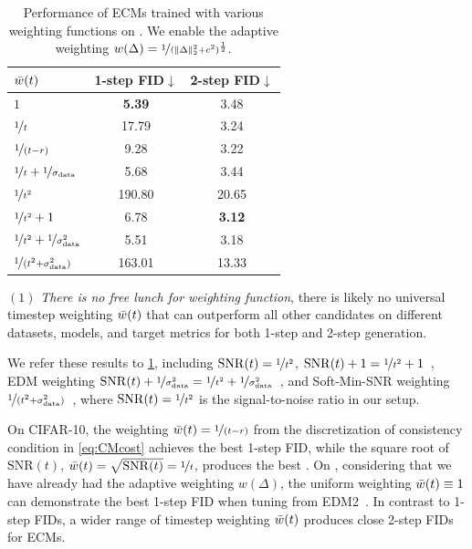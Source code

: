 \begin{table}[t!]
\vspace{5pt}
\caption{Performance of ECMs trained with various weighting functions on \imgnet. We enable the adaptive weighting $w(\Delta) = \nicefrac{1}{(\|\Delta\|_2^2 + c^2)^{\frac{1}{2}}}$.}
\vspace{5pt}
\centering
\begin{tabular}{@{}lcc@{}} 
\toprule
$\Bar{w}(t)$ & 1-step FID$\downarrow$ & 2-step FID$\downarrow$ \\ 
\midrule
$1$                   & \textbf{5.39}   & 3.48  \\
$\nicefrac{1}{t}$     & 17.79	        & 3.24  \\
$\nicefrac{1}{(t-r)}$ & 9.28	        & 3.22  \\
$\nicefrac{1}{t}+\nicefrac{1}{\sigma_{\mathrm{data}}}$  & 5.68 & 3.44  \\
$\nicefrac{1}{t^2}$   & 190.80          & 20.65         \\
$\nicefrac{1}{t^2}+1$ & 6.78            & \textbf{3.12} \\
$\nicefrac{1}{t^2}+\nicefrac{1}{\sigma_{\mathrm{data}}^2}$ & 5.51 & 3.18 \\
$\nicefrac{1}{(t^2 +\sigma_{\mathrm{data}}^2)}$ & 163.01          & 13.33 \\
\bottomrule
\end{tabular}
\label{tab:wt-imgnet}
\end{table}

$(1)$ \textit{There is no free lunch for weighting function}, \ie there is likely no universal timestep weighting $\Bar{w}(t)$ that can outperform all other candidates on different datasets, models, and target metrics for both 1-step and 2-step generation. 

We refer these results to \cref{tab:wt-imgnet}, including $\mathrm{SNR}(t) = \nicefrac{1}{t^2}$, $\mathrm{SNR}(t)+1 = \nicefrac{1}{t^2}+1$~\citep{salimans2022progressive}, EDM weighting $\mathrm{SNR}(t) + \nicefrac{1}{\sigma_{\mathrm{data}}^2} = \nicefrac{1}{t^2}+\nicefrac{1}{\sigma_{\mathrm{data}}^2}$~\citep{Karras2022edm}, and Soft-Min-SNR weighting $\nicefrac{1}{(t^2 +\sigma_{\mathrm{data}}^2)}$~\citep{min-snr,soft_min_snr}, where $\mathrm{SNR}(t) = \nicefrac{1}{t^2}$ is the signal-to-noise ratio in our setup.

On CIFAR-10, the weighting $\Bar{w}(t) = \nicefrac{1}{(t-r)}$ from the discretization of consistency condition in \cref{eq:CMcost} achieves the best 1-step FID, while the square root of $\mathrm{SNR}(t)$, $\Bar{w}(t) = \sqrt{\mathrm{SNR}(t)} = \nicefrac{1}{t}$, produces the best \dino. 
On \imgnet, considering that we have already had the adaptive weighting $w(\Delta)$, the uniform weighting $\Bar{w}(t) \equiv 1$ can demonstrate the best 1-step FID when tuning from EDM2~\citep{Karras2024edm2}.
%
In contrast to 1-step FIDs, a wider range of timestep weighting $\Bar{w}(t)$ produces close 2-step FIDs for ECMs. 

